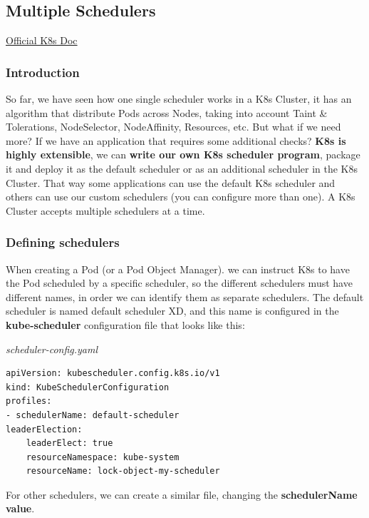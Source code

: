 \documentclass{article}
\newenvironment{codetemplate}[1][]{%
  \mybasecolorbox[#1]
  \itshape
}{%
  \endmybasecolorbox
}
\begin{document}
\subsection{Multiple Schedulers}

\href{https://kubernetes.io/docs/tasks/extend-kubernetes/configure-multiple-schedulers/}{Official K8s Doc}

\subsubsection{Introduction}

So far, we have seen how one single scheduler works in a K8s Cluster, it has an algorithm that distribute Pods across Nodes, taking into account Taint \& Tolerations, NodeSelector, NodeAffinity, Resources, etc. But what if we need more? If we have an application that requires some additional checks? \textbf{K8s is highly extensible}, we can\textbf{ write our own K8s scheduler program}, package it and deploy it as the default scheduler or as an additional scheduler in the K8s Cluster. That way some applications can use the default K8s scheduler and others can use our custom schedulers (you can configure more than one). A K8s Cluster accepts multiple schedulers at a time.

\subsubsection{Defining schedulers}

When creating a Pod (or a Pod Object Manager). we can instruct K8s to have the Pod scheduled by a specific scheduler, so the different schedulers must have different names, in order we can identify them as separate schedulers. The default scheduler is named default scheduler XD, and this name is configured in the \textbf{kube-scheduler} configuration file that looks like this:

\begin{codetemplate}{scheduler-config.yaml}
\begin{verbatim}
apiVersion: kubescheduler.config.k8s.io/v1
kind: KubeSchedulerConfiguration
profiles:
- schedulerName: default-scheduler
leaderElection:
    leaderElect: true
    resourceNamespace: kube-system
    resourceName: lock-object-my-scheduler
\end{verbatim}
\end{codetemplate}

For other schedulers, we can create a similar file, changing the \textbf{schedulerName value}.
\end{document}
